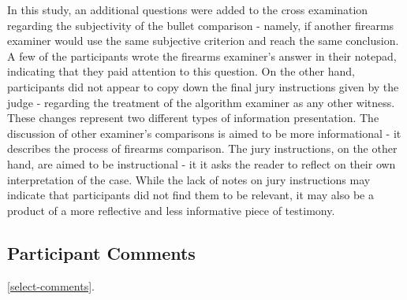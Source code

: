 \documentclass[print]{nuthesis}
\begin{document}
In this study, an additional questions were added to the cross examination regarding the subjectivity of the bullet comparison - namely, if another firearms examiner would use the same subjective criterion and reach the same conclusion.
A few of the participants wrote the firearms examiner's answer in their notepad, indicating that they paid attention to this question.
On the other hand, participants did not appear to copy down the final jury instructions given by the judge - regarding the treatment of the algorithm examiner as any other witness.
These changes represent two different types of information presentation.
The discussion of other examiner's comparisons is aimed to be more informational - it describes the process of firearms comparison.
The jury instructions, on the other hand, are aimed to be instructional - it it asks the reader to reflect on their own interpretation of the case.
While the lack of notes on jury instructions may indicate that participants did not find them to be relevant, it may also be a product of a more reflective and less informative piece of testimony.

\hypertarget{participant-comments}{%
\subsection{Participant Comments}\label{participant-comments}}

\ref{select-comments}.

\begin{quote}
\end{quote}

\begin{quote}
\end{quote}


\begin{quote}
\end{quote}
\end{document}
